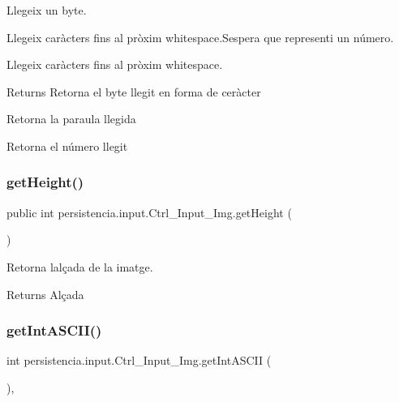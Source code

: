 Llegeix un byte. 

Llegeix caràcters fins al pròxim whitespace.\+S\textquotesingle{}espera que representi un número.

Llegeix caràcters fins al pròxim whitespace.

\begin{DoxyReturn}{Returns}
Retorna el byte llegit en forma de ceràcter

Retorna la paraula llegida

Retorna el número llegit 
\end{DoxyReturn}
\mbox{\label{classpersistencia_1_1input_1_1Ctrl__Input__Img_a55dc2906950235559f83b4765aea73e8}} 
\subsubsection{\texorpdfstring{get\+Height()}{getHeight()}}
{\footnotesize\ttfamily public int persistencia.\+input.\+Ctrl\+\_\+\+Input\+\_\+\+Img.\+get\+Height (\begin{DoxyParamCaption}{ }\end{DoxyParamCaption})\hspace{0.3cm}{\ttfamily [inline]}}



Retorna l\textquotesingle{}alçada de la imatge. 

\begin{DoxyReturn}{Returns}
Alçada 
\end{DoxyReturn}
\mbox{\label{classpersistencia_1_1input_1_1Ctrl__Input__Img_a430158ff229038ddc3476d406239f4cd}} 
\subsubsection{\texorpdfstring{get\+Int\+A\+S\+C\+I\+I()}{getIntASCII()}}
{\footnotesize\ttfamily int persistencia.\+input.\+Ctrl\+\_\+\+Input\+\_\+\+Img.\+get\+Int\+A\+S\+C\+II (\begin{DoxyParamCaption}{ }\end{DoxyParamCaption})\hspace{0.3cm}{\ttfamily [inline]}, {\ttfamily [private]}}


